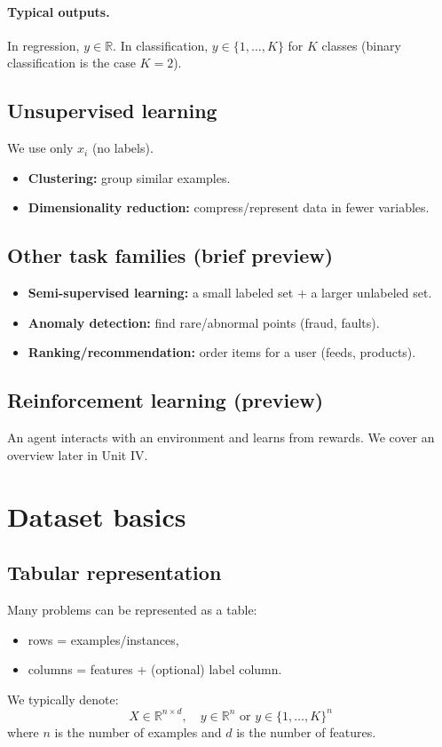\documentclass[11pt]{article}
\begin{document}
\paragraph{Typical outputs.}
In regression, $y \in \mathbb{R}$.
In classification, $y \in \{1,\dots,K\}$ for $K$ classes (binary classification is the case $K=2$).

\subsection{Unsupervised learning}
We use only $x_i$ (no labels).
\begin{itemize}[leftmargin=*]
  \item \textbf{Clustering:} group similar examples.
  \item \textbf{Dimensionality reduction:} compress/represent data in fewer variables.
\end{itemize}

\subsection{Other task families (brief preview)}
\begin{itemize}[leftmargin=*]
  \item \textbf{Semi-supervised learning:} a small labeled set + a larger unlabeled set.
  \item \textbf{Anomaly detection:} find rare/abnormal points (fraud, faults).
  \item \textbf{Ranking/recommendation:} order items for a user (feeds, products).
\end{itemize}

\subsection{Reinforcement learning (preview)}
An agent interacts with an environment and learns from rewards. We cover an overview later in Unit IV.

\section{Dataset basics}
\subsection{Tabular representation}
Many problems can be represented as a table:
\begin{itemize}[leftmargin=*]
  \item rows = examples/instances,
  \item columns = features + (optional) label column.
\end{itemize}
We typically denote:
\[
  X \in \mathbb{R}^{n \times d},\quad y \in \mathbb{R}^{n} \text{ or } y \in \{1,\dots,K\}^{n}
\]
where $n$ is the number of examples and $d$ is the number of features.
\end{document}
